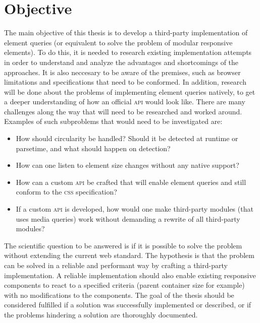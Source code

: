 \documentclass[a4paper,11pt]{kth-mag}
\begin{document}
    \section{Objective}
      The main objective of this thesis is to develop a third-party implementation of element queries (or equivalent to solve the problem of modular responsive elements).
      To do this, it is needed to research existing implementation attempts in order to understand and analyze the advantages and shortcomings of the approaches.
      It is also neccesary to be aware of the premises, such as browser limitations and specifications that need to be conformed.
      In addition, research will be done about the problems of implementing element queries natively, to get a deeper understanding of how an official \textsc{api} would look like.
      There are many challenges along the way that will need to be researched and worked around.
      Examples of such subproblems that would need to be investigated are:
      \begin{itemize}
        \item How should circularity be handled? Should it be detected at runtime or parsetime, and what should happen on detection?
        \item How can one listen to element size changes without any native support?
        \item How can a custom \textsc{api} be crafted that will enable element queries and still conform to the \textsc{css} specification?
        \item If a custom \textsc{api} is developed, how would one make third-party modules (that uses media queries) work without demanding a rewrite of all third-party modules?
      \end{itemize}
      The scientific question to be answered is if it is possible to solve the problem  without extending the current web standard.
      The hypothesis is that the problem can be solved in a reliable and performant way by crafting a third-party implementation.
      A reliable implementation should also enable existing responsive components to react to a specified criteria (parent container size for example) with no modifications to the components.
      The goal of the thesis should be considered fulfilled if a solution was successfully implemented or described, or if the problems hindering a solution are thoroughly documented.
\end{document}
